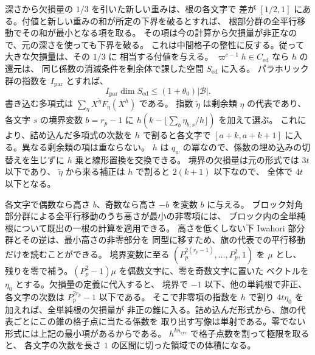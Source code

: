 深さから欠損量の \(1/3\) を引いた新しい重みは、根の各文字で
差が \([1/2,1]\) にある。付値と新しい重みの和が所定の下界を破るとすれば、
根部分群の全平行移動でその和が最小となる項を取る。
その項は今の計算から欠損量が非正なので、元の深さを使っても下界を破る。
これは中間格子の整性に反する。従って大きな欠損量は、その \(1/3\) に
相当する付値を与える。
\(\varpi^{c-1}h\in C_\mathrm{ed}\) なら \(h\) の還元は、
同じ係数の消滅条件を剰余体で課した空間 \(S_\mathrm{ed}\) に入る。
パラホリック群の指数を \(I_\mathrm{par}\) とすれば、
\[
 I_\mathrm{par}\dim S_\mathrm{ed}\le(1+\theta_0)|\mathcal B|.
\]
書き込む多項式は \(\sum_\eta X^{\widetilde\eta}F_\eta(X^h)\) である。
指数 \(\widetilde\eta\) は剰余類 \(\eta\) の代表であり、
各文字 \(s\) の境界変数 \(b=r_p-1\) に
\(h(k-\lfloor\sum_b\eta_{b,s}/h\rfloor)\) を加えて選ぶ。
これにより、詰め込んだ多項式の次数を \(h\) で割ると各文字で
\([a+k,a+k+1]\) に入る。異なる剰余類の項は重ならない。
\(h\) は \(q_w\) の冪なので、係数の埋め込みの切替えを生じずに
\(h\) 乗と線形置換を交換できる。
境界の欠損量は元の形式では \(3t\) 以下であり、
\(\widetilde\eta\) から来る補正は \(h\) で割ると \(2(k+1)\) 以下なので、
全体で \(4t\) 以下となる。

各文字で偶数なら高さ \(b\)、奇数なら高さ \(-b\) を変数 \(b\) に与える。
ブロック対角部分群による全平行移動のうち高さが最小の非零項には、
ブロック内の全単純根について既出の一根の計算を適用できる。
高さを低くしない下 Iwahori 部分群とその逆は、最小高さの非零部分を
同型に移すため、旗の代表での平行移動だけを読むことができる。
境界変数に至る \((P_p^{2(r_p-1)},\ldots,P_p^2,1)\) を \(\mu\) とし、
残りを零で補う。\((P_p^2-1)\mu\) を偶数文字に、零を奇数文字に置いた
ベクトルを \(\eta_0\) とする。欠損量の定義に代入すると、
境界で \(-1\) 以下、他の単純根で非正、各文字の次数は \(P_p^{2r_p}-1\) 以下である。
そこで非零項の指数を \(h\) で割り \(4t\eta_0\) を加えれば、全単純根の欠損量が
非正の錐に入る。詰め込んだ形式から、旗の代表ごとにこの錐の格子点に当たる係数を
取り出す写像は単射である。零でない形式には上記の最小項があるからである。
\(h^{kn_\mathrm{cyc}}\) で格子点数を割って極限を取ると、
各文字の次数を長さ \(1\) の区間に切った領域での体積になる。

